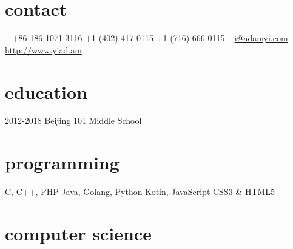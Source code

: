 \documentclass[]{adamyi-cv} %
\begin{document}



\begin{aside} %
\section{contact}
~
+86 186-1071-3116
+1 (402) 417-0115
+1 (716) 666-0115
~
\href{mailto:i@adamyi.com}{i@adamyi.com}
\href{https://www.yiad.am}{http://www.yiad.am}
\section{education}
2012-2018 Beijing 101 Middle School
\section{programming}
C, C++, PHP
Java, Golang, Python
Kotin, JavaScript
CSS3 \& HTML5
\versionsection
\end{aside}


\section{computer science}
\end{document}
